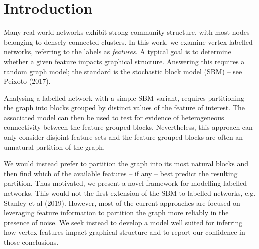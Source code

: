 \section{Introduction}

Many real-world networks exhibit strong community structure, with most nodes belonging to densely connected clusters. 
In this work, we examine vertex-labelled networks, 
referring to the labels as {\em features}. A typical goal is to determine whether a given feature impacts graphical structure. Answering this requires a random graph model;
the standard is the stochastic block model (SBM) -- see Peixoto (2017).

Analysing a labelled network with a simple SBM variant, requires partitioning the graph into blocks grouped by distinct values of the feature of interest. The associated model can then be used to test for evidence of heterogeneous connectivity between the feature-grouped blocks. Nevertheless, this approach can only consider disjoint feature sets and the feature-grouped blocks are often an unnatural partition of the graph.

We would instead prefer to partition the graph into its most natural blocks and then find which of the available features -- if any -- best predict the resulting partition. Thus motivated, we present a novel framework for modelling labelled networks.
This would not the first extension of the SBM to labelled networks, e.g. Stanley et al (2019). However, most of the current approaches are focused on leveraging feature information to partition the graph more reliably in the presence of noise.
We seek instead to develop a model well suited for inferring how vertex features impact graphical structure and to report our confidence in those conclusions.
